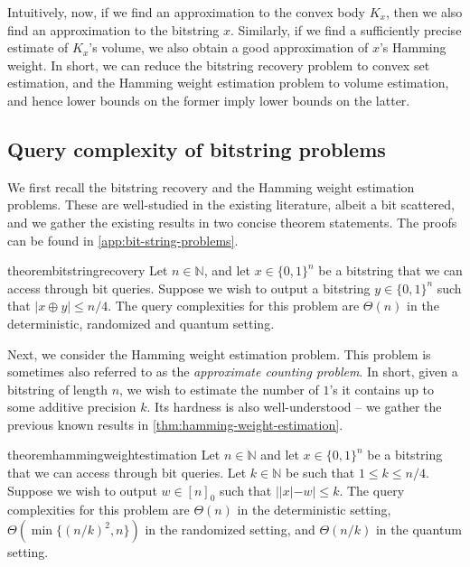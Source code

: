 \documentclass[11pt]{article}
\newcommand{\N}{\ensuremath{\mathbb{N}}}
\begin{document}
    Intuitively, now, if we find an approximation to the convex body $K_x$, then we also find an approximation to the bitstring $x$. Similarly, if we find a sufficiently precise estimate of $K_x$'s volume, we also obtain a good approximation of $x$'s Hamming weight. In short, we can reduce the bitstring recovery problem to convex set estimation, and the Hamming weight estimation problem to volume estimation, and hence lower bounds on the former imply lower bounds on the latter.

    \subsection{Query complexity of bitstring problems}
    \label{subsec:bit-string-problems}

    We first recall the bitstring recovery and the Hamming weight estimation problems. These are well-studied in the existing literature, albeit a bit scattered, and we gather the existing results in two concise theorem statements. The proofs can be found in \cref{app:bit-string-problems}.

    \begin{restatable}{theorem}{bitstringrecovery}
        \label{thm:bit-string-recovery}
        Let $n \in \N$, and let $x \in \{0,1\}^n$ be a bitstring that we can access through bit queries. Suppose we wish to output a bitstring $y \in \{0,1\}^n$ such that $|x \oplus y| \leq n/4$. The query complexities for this problem are $\Theta(n)$ in the deterministic, randomized and quantum setting.
    \end{restatable}

    Next, we consider the Hamming weight estimation problem. This problem is sometimes also referred to as the \textit{approximate counting problem}. In short, given a bitstring of length $n$, we wish to estimate the number of $1$'s it contains up to some additive precision $k$. Its hardness is also well-understood -- we gather the previous known results in \cref{thm:hamming-weight-estimation}.

    \begin{restatable}{theorem}{hammingweightestimation}
        \label{thm:hamming-weight-estimation}
        Let $n \in \N$ and let $x \in \{0,1\}^n$ be a bitstring that we can access through bit queries. Let $k \in \N$ be such that $1 \leq k \leq n/4$. Suppose we wish to output $w \in [n]_0$ such that $||x| - w| \leq k$. The query complexities for this problem are $\Theta(n)$ in the deterministic setting, $\Theta(\min\{(n/k)^2,n\})$ in the randomized setting, and $\Theta(n/k)$ in the quantum setting.
    \end{restatable}
\end{document}
